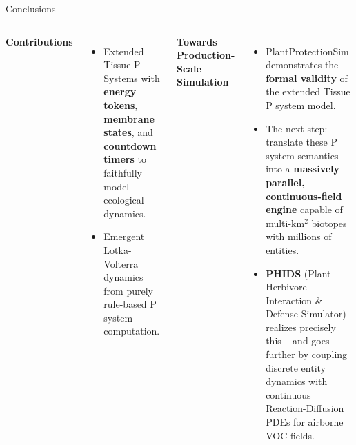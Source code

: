 \documentclass[aspectratio=169]{beamer}
\begin{document}
\begin{frame}{Conclusions}
    \begin{columns}[T, onlytextwidth]
        \textbf{Contributions}
        \begin{itemize}\footnotesize
            \item Extended Tissue P Systems with \textbf{energy tokens}, \textbf{membrane states}, and \textbf{countdown timers} to faithfully model ecological dynamics.
            \item Emergent Lotka-Volterra dynamics from purely rule-based P system computation.
        \end{itemize}
        \vspace{0.15cm}
        \textbf{Towards Production-Scale Simulation}
        \begin{itemize}\footnotesize
            \item PlantProtectionSim demonstrates the \textbf{formal validity} of the extended Tissue P system model.
            \item The next step: translate these P system semantics into a \textbf{massively parallel, continuous-field engine} capable of multi-km$^2$ biotopes with millions of entities.
            \item \textbf{PHIDS} (Plant-Herbivore Interaction \& Defense Simulator) realizes precisely this -- and goes further by coupling discrete entity dynamics with continuous Reaction-Diffusion PDEs for airborne VOC fields.
        \end{itemize}


\end{columns}
\end{frame}
\end{document}
